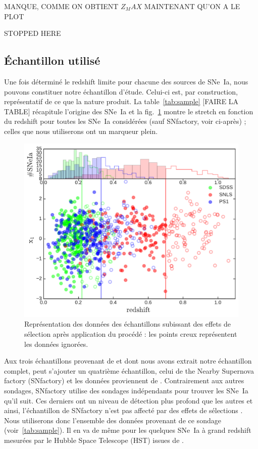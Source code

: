 \documentclass[a4paper, 12pt, svgnames]{article}
\newcommand{\mr}[1]{{\textcolor[rgb]{0.80,0.10,0.1}{#1}}}
\begin{document}
\mr{MANQUE, COMME ON OBTIENT $Z_MAX$ MAINTENANT QU'ON A LE PLOT}

\mr{STOPPED HERE}

\subsection{Échantillon utilisé}

Une fois déterminé le redshift limite pour chacune des sources de SNe~Ia, nous
pouvons constituer notre échantillon d'étude. Celui-ci est, par construction,
représentatif de ce que la nature produit. La table~\ref{tab:sample} [FAIRE LA
TABLE] récapitule l'origine des SNe~Ia et la fig.~\ref{fig:surveys_cuts} montre
le stretch en fonction du redshift pour toutes les SNe~Ia considérées (sauf
SNfactory, voir ci-après) ; celles que nous utiliserons ont un marqueur plein.

\begin{figure}[htbp!]
    \centering
    \includegraphics[width=.5\linewidth]{Rapport_figures/surveys_cuts.pdf}
    \captionsetup{justification=centering}
    \caption{Représentation des données des échantillons subissant des effets
    de sélection après application du procédé : les points creux représentent
    les données ignorées.}
    \label{fig:surveys_cuts}
\end{figure}

Aux trois échantillons provenant de \cite{scolnic_complete_2018} et dont nous
avons extrait notre échantillon complet, peut s'ajouter un quatrième
échantillon, celui de the Nearby Supernova factory (SNfactory)
\cite{wood-vasey_nearby_2004} et les données proviennent de
\cite{rigault_strong_2018}.  Contrairement aux autres sondages, SNfactory
utilise des sondages indépendants pour trouver les SNe~Ia qu'il suit. Ces
derniers ont un niveau de détection plus profond que les autres et ainsi,
l'échantillon de SNfactory n'est pas affecté par des effets de sélections
\cite{rigault_strong_2018}. Nous utiliserons donc l'ensemble des données
provenant de ce sondage (voir~\ref{tab:sample}). Il en va de même pour les
quelques SNe~Ia à grand redshift mesurées par le Hubble Space Telescope (HST)
issues de \cite{scolnic_complete_2018}.
\end{document}
